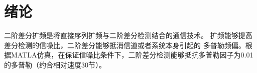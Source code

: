 \chapter{绪论}
二阶差分扩频是将直接序列扩频与二阶差分检测结合的通信技术。
扩频能够提高差分检测的信噪比，二阶差分能够抵消信道或者系统本身引起的
多普勒频偏。根据MATLA仿真，在保证信噪比条件下，二阶差分检测能够抵抗多普勒因子为0.01的多普勒（约合相对速度30节）。